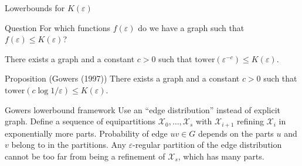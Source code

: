 \documentclass{beamer}
\newcommand{\twr}{\mathrm{tower}}
\newcommand{\1}{\mathbbm{1}}
\newcommand{\X}{\mathcal{X}}
\newcommand{\eps}{\varepsilon}
\begin{document}
\begin{frame}{Lowerbounds for $K(\eps)$}
  \begin{block}{Question}
    For which functions $f(\eps)$ do we have a graph such that $f(\eps) \le K(\eps)$?
  \end{block}

  \pause
  \begin{theorem}[Gowers (1997)]
    There exists a graph and a constant $c > 0$ such that $\twr(\eps^{-c}) \le K(\eps)$.
  \end{theorem}

  \pause

  \begin{block}{Proposition (Gowers (1997))}
    There exists a graph and a constant $c > 0$ such that $\twr(c\log 1/\eps) \le
      K(\eps)$.
  \end{block}
\end{frame}

\begin{frame}{Gowers lowerbound framework}
  Use an ``edge distribution'' instead of explicit graph.
  \pause
  Define a sequence of equipartitions $\X_0, \dots, \X_s$ with $\X_{i + 1}$ refining
  $\X_i$ in exponentially more parts.
  \pause
  Probability of edge $uv \in G$ depends on the parts $u$ and $v$ belong to in the
  partitions.
  \pause
  Any $\eps$-regular partition of the edge distribution cannot be too far from being a
  refinement of $\X_s$, which has many parts.
\end{frame}
\end{document}

